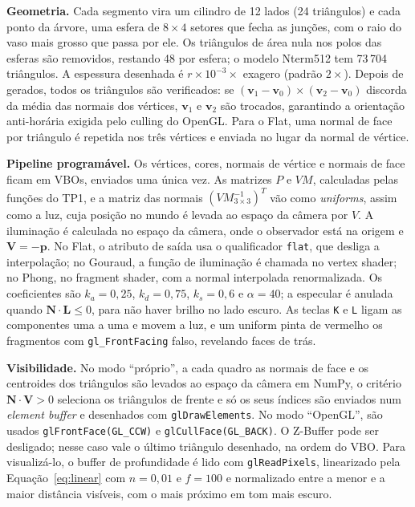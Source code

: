 \documentclass[11pt, a4paper]{article}
\newcommand{\vetor}[1]{\mathbf{#1}}
\begin{document}
\textbf{Geometria.} Cada segmento vira um cilindro de 12 lados (24 triângulos) e cada ponto da árvore, uma esfera de $8 \times 4$ setores que fecha as junções, com o raio do vaso mais grosso que passa por ele. Os triângulos de área nula nos polos das esferas são removidos, restando 48 por esfera; o modelo Nterm512 tem 73\,704 triângulos. A espessura desenhada é $r \times 10^{-3} \times$ exagero (padrão $2\times$). Depois de gerados, todos os triângulos são verificados: se $(\vetor{v}_1 - \vetor{v}_0) \times (\vetor{v}_2 - \vetor{v}_0)$ discorda da média das normais dos vértices, $\vetor{v}_1$ e $\vetor{v}_2$ são trocados, garantindo a orientação anti-horária exigida pelo culling do OpenGL. Para o Flat, uma normal de face por triângulo é repetida nos três vértices e enviada no lugar da normal de vértice.

\textbf{Pipeline programável.} Os vértices, cores, normais de vértice e normais de face ficam em VBOs, enviados uma única vez. As matrizes $P$ e $VM$, calculadas pelas funções do TP1, e a matriz das normais $(VM_{3\times3}^{-1})^T$ vão como \emph{uniforms}, assim como a luz, cuja posição no mundo é levada ao espaço da câmera por $V$. A iluminação é calculada no espaço da câmera, onde o observador está na origem e $\vetor{V} = -\vetor{p}$. No Flat, o atributo de saída usa o qualificador \texttt{flat}, que desliga a interpolação; no Gouraud, a função de iluminação é chamada no vertex shader; no Phong, no fragment shader, com a normal interpolada renormalizada. Os coeficientes são $k_a = 0{,}25$, $k_d = 0{,}75$, $k_s = 0{,}6$ e $\alpha = 40$; a especular é anulada quando $\vetor{N}\cdot\vetor{L} \le 0$, para não haver brilho no lado escuro. As teclas \texttt{K} e \texttt{L} ligam as componentes uma a uma e movem a luz, e um uniform pinta de vermelho os fragmentos com \texttt{gl\_FrontFacing} falso, revelando faces de trás.

\textbf{Visibilidade.} No modo ``próprio'', a cada quadro as normais de face e os centroides dos triângulos são levados ao espaço da câmera em NumPy, o critério $\vetor{N}\cdot\vetor{V} > 0$ seleciona os triângulos de frente e só os seus índices são enviados num \emph{element buffer} e desenhados com \texttt{glDrawElements}. No modo ``OpenGL'', são usados \texttt{glFrontFace(GL\_CCW)} e \texttt{glCullFace(GL\_BACK)}. O Z-Buffer pode ser desligado; nesse caso vale o último triângulo desenhado, na ordem do VBO. Para visualizá-lo, o buffer de profundidade é lido com \texttt{glReadPixels}, linearizado pela Equação~\eqref{eq:linear} com $n = 0{,}01$ e $f = 100$ e normalizado entre a menor e a maior distância visíveis, com o mais próximo em tom mais escuro.
\end{document}
